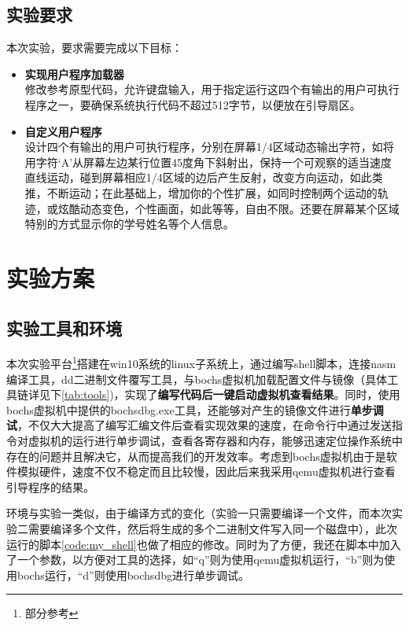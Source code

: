 \documentclass[forprint]{WHUBachelor}
\begin{document}
\section{实验要求}

本次实验，要求需要完成以下目标：\\

\begin{itemize}
  \item \textbf{实现用户程序加载器} \\
  修改参考原型代码，允许键盘输入，用于指定运行这四个有输出的用户可执行程序之一，要确保系统执行代码不超过512字节，以便放在引导扇区。
  \item \textbf{自定义用户程序} \\
  设计四个有输出的用户可执行程序，分别在屏幕1/4区域动态输出字符，如将用字符‘A’从屏幕左边某行位置45度角下斜射出，保持一个可观察的适当速度直线运动，碰到屏幕相应1/4区域的边后产生反射，改变方向运动，如此类推，不断运动；在此基础上，增加你的个性扩展，如同时控制两个运动的轨迹，或炫酷动态变色，个性画面，如此等等，自由不限。还要在屏幕某个区域特别的方式显示你的学号姓名等个人信息。
\end{itemize}

\chapter{实验方案}

\section{实验工具和环境}

本次实验平台\footnote{部分参考\cite{于渊2009orange}}搭建在win10系统的linux子系统上，通过编写shell脚本，连接nasm编译工具，dd二进制文件覆写工具，与bochs虚拟机加载配置文件与镜像（具体工具链详见下\autoref{tab:tools})，实现了\textbf{编写代码后一键启动虚拟机查看结果}。同时，使用bochs虚拟机中提供的bochsdbg.exe工具，还能够对产生的镜像文件进行\textbf{单步调试}，不仅大大提高了编写汇编文件后查看实现效果的速度，在命令行中通过发送指令对虚拟机的运行进行单步调试，查看各寄存器和内存，能够迅速定位操作系统中存在的问题并且解决它，从而提高我们的开发效率。考虑到bochs虚拟机由于是软件模拟硬件，速度不仅不稳定而且比较慢，因此后来我采用qemu虚拟机进行查看引导程序的结果。

环境与实验一类似，由于编译方式的变化（实验一只需要编译一个文件，而本次实验二需要编译多个文件，然后将生成的多个二进制文件写入同一个磁盘中），此次运行的脚本\autoref{code:my_shell}也做了相应的修改。同时为了方便，我还在脚本中加入了一个参数，以方便对工具的选择，如“q”则为使用qemu虚拟机运行，“b”则为使用bochs运行，“d”则使用bochsdbg进行单步调试。
\end{document}
